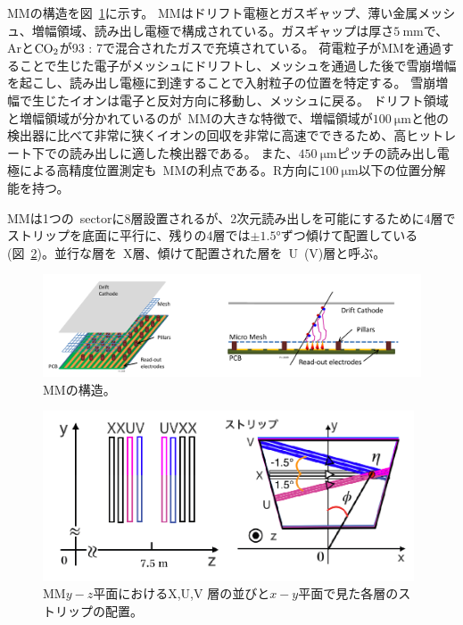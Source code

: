 MMの構造を図~\ref{fig:2-25}に示す。
MMはドリフト電極とガスギャップ、薄い金属メッシュ、増幅領域、読み出し電極で構成されている。ガスギャップは厚さ$\SI{5}{\mm}$で、Arと$\rm{CO_{2}}$が93 : 7で混合されたガスで充填されている。
荷電粒子がMMを通過することで生じた電子がメッシュにドリフトし、メッシュを通過した後で雪崩増幅を起こし、読み出し電極に到達することで入射粒子の位置を特定する。
雪崩増幅で生じたイオンは電子と反対方向に移動し、メッシュに戻る。
ドリフト領域と増幅領域が分かれているのが~MMの大きな特徴で、増幅領域が$\SI{100}{\um}$と他の検出器に比べて非常に狭くイオンの回収を非常に高速でできるため、高ヒットレート下での読み出しに適した検出器である。
また、$\SI{450}{\um}$ピッチの読み出し電極による高精度位置測定も~MMの利点である。R方向に$\SI{100}{\um}$以下の位置分解能を持つ。

MMは1つの~sectorに8層設置されるが、2次元読み出しを可能にするために4層でストリップを底面に平行に、残りの4層では$\pm \si{\ang{1.5}}$ずつ傾けて配置している(図~\ref{fig:2-26})。並行な層を~X層、傾けて配置された層を~U~(V)層と呼ぶ。

\begin{figure}[h]
  \centering
  \includegraphics[clip, width=13cm]{fig/2/mm-structure.pdf}
  \caption{MMの構造\cite{article:ATLASNSWTDR}。}
  \label{fig:2-25}
\end{figure}

\begin{figure}[h]
  \centering
  \includegraphics[clip, width=11cm]{fig/2/mm_stereolayer.png}
  \caption{MM$y−z$平面におけるX,U,V 層の並びと$x−y$平面で見た各層のストリップの配置\cite{article:kumaoka}。}
  \label{fig:2-26}
\end{figure}